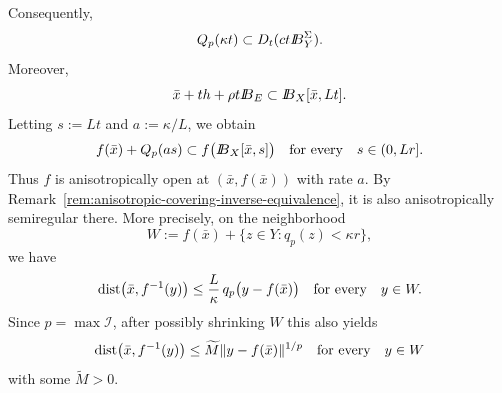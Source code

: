 \documentclass[11pt]{amsart}
\theoremstyle{definition}
\theoremstyle{remark}
\newcommand{\bx}{\bar x}
\newcommand{\dist}{\mathop{\rm dist}\nolimits}
\def\ball{{I\kern -.35em B}}
\begin{document}
	Consequently,
	$$
	Q_p(\kappa t)
	\subset
	D_t(ct\ball_Y^\Sigma).
	$$
	Moreover,
	$$
	\bx+th+\rho t\ball_E
	\subset
	\ball_X[\bx,Lt].
	$$
	Letting $s:=Lt$ and $a:=\kappa/L$, we obtain
	\begin{equation}
		f(\bx)+Q_p(as)
		\subset
		f\bigl(\ball_X[\bx,s]\bigr)
		\quad\text{for every}\quad s\in(0,Lr].
		\label{eq:p-factor-fixed-base-openness}
	\end{equation}
	Thus $f$ is anisotropically open at $(\bx,f(\bx))$ with rate $a$.
	By Remark~\ref{rem:anisotropic-covering-inverse-equivalence}, it is also
	anisotropically semiregular there. More precisely, on the neighborhood
	$$
	W:=f(\bx)+\{z\in Y:q_p(z)<\kappa r\},
	$$
	we have
	$$
	\dist\bigl(\bx,f^{-1}(y)\bigr)
	\le
	\frac{L}{\kappa}\,
	q_p\bigl(y-f(\bx)\bigr)
	\quad\text{for every}\quad y\in W.
	$$
	Since $p=\max\mathcal I$, after possibly shrinking $W$ this also yields
	$$
	\dist\bigl(\bx,f^{-1}(y)\bigr)
	\le
	\widetilde M\|y-f(\bx)\|^{1/p}
	\quad\text{for every}\quad y\in W
	$$
	with some $\widetilde M>0$.
	
\end{document}
